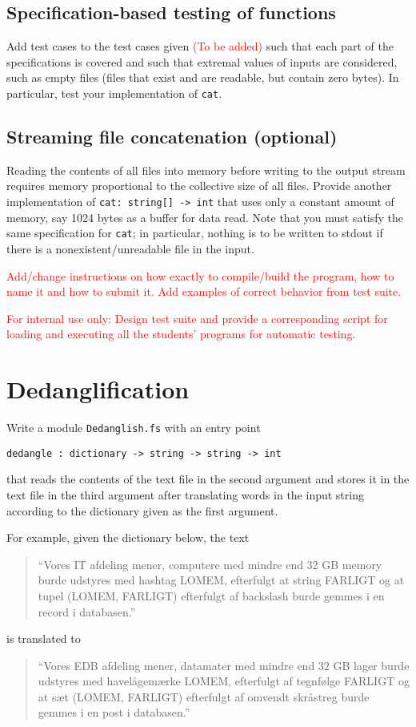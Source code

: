 \documentclass[a4paper,11pt]{article}
\newcommand{\comment}[1]{\textcolor{red}{#1}}
\begin{document}
\subsection{Specification-based testing of functions}

Add test cases to the test cases given \comment{(To be added)} such that each part of the specifications is covered and such that  extremal values of inputs are considered, such as empty files (files that exist and are readable, but contain zero bytes).   In particular, test your implementation of \texttt{cat}.

\subsection{Streaming file concatenation (optional)} 

Reading the contents of all files into memory before writing to the output stream requires memory proportional to the collective size of all files.  Provide another implementation of \texttt{cat: string[] -> int} that uses only a constant amount of memory, say 1024 bytes as a buffer for data read.  Note that you must satisfy the same specification for \texttt{cat}; in particular, nothing is to be written to stdout if there is a nonexistent/unreadable file in the input.

\comment{Add/change instructions on how exactly to compile/build the program, how to name it and how to submit it.  Add examples of correct behavior from test suite.}

\comment{For internal use only: Design test suite and provide a corresponding script for loading and executing all the students' programs for automatic testing.}

\section{Dedanglification}

Write a module \verb|Dedanglish.fs| with an entry point
\begin{verbatim}
dedangle : dictionary -> string -> string -> int
\end{verbatim}
that reads the contents of the text file in the second argument and stores it in the text file in the third argument after translating words in the input string according to the dictionary given as the first argument.  

For example, given the dictionary below, the text 
\begin{quote}
``Vores IT afdeling mener, computere med mindre end 32 GB memory burde udstyres med hashtag LOMEM, efterfulgt at string FARLIGT og at tupel (LOMEM, FARLIGT) efterfulgt af backslash burde gemmes i en record i databasen.'' 
\end{quote}
is translated to 
\begin{quote}
``Vores EDB afdeling mener, datamater med mindre end 32 GB lager burde udstyres med havel\aa gem\ae rke LOMEM, efterfulgt af tegnf\o lge FARLIGT og at s\ae t (LOMEM, FARLIGT) efterfulgt af omvendt skr\aa streg burde gemmes i en post i databasen.''
\end{quote}
\end{document}

